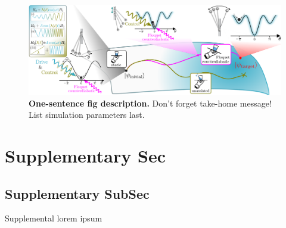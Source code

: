 \documentclass[
aps,
prx,
showpacs,
preprintnumbers,
twocolumn,
superscriptaddress,
10pt,
]{revtex4-2}
\begin{document}
\begin{figure}[t!]
	\centering
	\includegraphics[width=1\textwidth]{./fig-S01/SI-fig.pdf}
	\caption{
		\textbf{One-sentence fig description.}
		Don't forget take-home message!
		List simulation parameters last. 
	}  
	\label{fig:SI}
\end{figure}


\section{Supplementary Sec}


\subsection{Supplementary SubSec}



Supplemental lorem ipsum~\cite{dadhichi2020nonmutual}


\fi %


	
\end{document}
